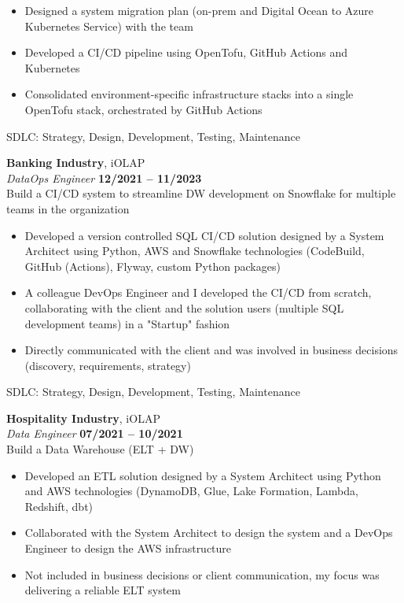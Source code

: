 \documentclass[margin,line]{resume}
\begin{document}
\begin{resume}
    \begin{itemize}
        \item Designed a system migration plan (on-prem and Digital Ocean to Azure Kubernetes Service) with the team
		\item Developed a CI/CD pipeline using OpenTofu, GitHub Actions and Kubernetes
		\item Consolidated environment-specific infrastructure stacks into a single OpenTofu stack, orchestrated by GitHub Actions
		
    \end{itemize}

    SDLC: Strategy, Design, Development, Testing, Maintenance

    \textbf{Banking Industry}, iOLAP \vspace{2mm}\\\vspace{1mm}%
    \textsl{DataOps Engineer} \hfill \textbf{12/2021 -- 11/2023}\\
    Build a CI/CD system to streamline DW development on Snowflake for multiple teams in the organization

    \begin{itemize}
        \item Developed a version controlled SQL CI/CD solution designed by a System Architect using Python, AWS and Snowflake technologies (CodeBuild, GitHub (Actions), Flyway, custom Python packages)
		\item A colleague DevOps Engineer and I developed the CI/CD from scratch, collaborating with the client and the solution users (multiple SQL development teams) in a "Startup" fashion
		\item Directly communicated with the client and was involved in business decisions (discovery, requirements, strategy)
		
    \end{itemize}

    SDLC: Strategy, Design, Development, Testing, Maintenance

    \textbf{Hospitality Industry}, iOLAP \vspace{2mm}\\\vspace{1mm}%
    \textsl{Data Engineer} \hfill \textbf{07/2021 -- 10/2021}\\
    Build a Data Warehouse (ELT + DW)

    \begin{itemize}
        \item Developed an ETL solution designed by a System Architect using Python and AWS technologies (DynamoDB, Glue, Lake Formation, Lambda, Redshift, dbt)
		\item Collaborated with the System Architect to design the system and a DevOps Engineer to design the AWS infrastructure
		\item Not included in business decisions or client communication, my focus was delivering a reliable ELT system
		

\end{itemize}
\end{resume}
\end{document}
